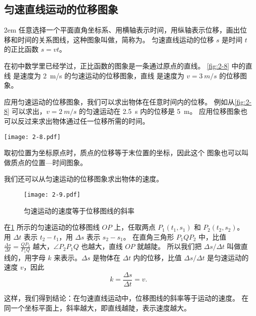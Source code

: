\subsection{匀速直线运动的位移图象} 
\medskip\noindent
\begin{minipage}{0.55\linewidth}\parindent2em
任意选择一个平面直角坐标系、用横轴表示时间，用纵轴表示位移，画出位移和时间的关系图线，这种图象叫做，简称为。
匀速直线运动的位移 $s$ 是时间 $t$ 的正比函数 $s=vt$。

在初中数学里已经学过，正比函数的图象是一条通过原点的直线。
\cref{fig:2-8} 中的直线  是速度为 \qty{2}{m/s} 的匀速运动的位移图象，直线  是速度为 $v=\qty{3}{m/s}$ 的位移图象。

应用匀速运动的位移图象，我们可以求出物体在任意时间内的位移。
例如从\cref{fig:2-8} 可以求出，$v=\qty{2}{m/s}$ 的匀速运动在 \qty{2.5}{s} 内的位移是 \qty{5}{m}。
应用位移图象也可以反过来求出物体通过任一位移所需的时间。
\end{minipage}\hfill
\begin{minipage}{0.4\linewidth}\centering
  \begin{figurehere}\small
    \texttt{[image: 2-8.pdf]}
    \begin{minipage}{\linewidth}
    取初位置为坐标原点时，质点的位移等于末位置的坐标，因此这个
    图象也可以叫做质点的位置—时间图象。
    \end{minipage}
    \caption{匀速运动的位移图象}\label{fig:2-8}
  \end{figurehere}
\end{minipage}

\bigskip
我们还可以从匀速运动的位移图象求出物体的速度。

\begin{figure}
  \texttt{[image: 2-9.pdf]}
  \caption{匀速运动的速度等于位移图线的斜率}\label{fig:2-9}
\end{figure}

在\cref{fig:2-9} 所示的匀速运动的位移图线 $OP$ 上，任取两点 $P_1(t_1,s_1)$ 和 $P_2(t_2,s_2)$。
用 $\Delta t$ 表示 $t_2-t_1$，用 $\Delta s$ 表示 $s_2-s_1$。
在直角三角形 $P_1QP_2$ 中，比值 $\frac{\Delta s}{\Delta t}=\frac{QP_2}{P_1Q}$ 越大，$\angle P_2P_1Q$ 也越大，直线 $OP$ 就越陡。
所以我们把 $\Delta s/\Delta t$ 叫做直线的，用字母 $k$ 来表示。$\Delta s$ 是物体在 $\Delta t$ 内的位移，比值 $\Delta s/\Delta t$ 是匀速运动的速度 $v$，因此
\[k=\frac{\Delta s}{\Delta t}=v.\]

这样，我们得到结论：在匀速直线运动中，位移图线的斜率等于运动的速度。
在同一个坐标平面上，斜率越大，即直线越陡，表示速度越大。
 
